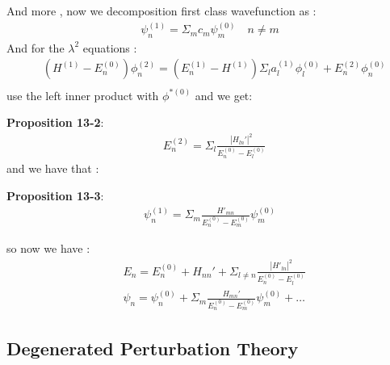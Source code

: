 \documentclass{article}
\begin{document}
And more , now we decomposition first class wavefunction as :
\begin{align}
  \psi_n^{(1)}=\Sigma_mc_m\psi^{(0)}_m\quad n\ne m
\end{align}
And for the $\lambda^2$ equations :
\begin{align}
  &(H^{(1)}-E^{(0)}_n)\phi^{(2)}_n=(E_n^{(1)}-H^{(1)})\Sigma_l a_l^{(1)}\phi_l^{(0)}+E_n^{(2)}\phi_n^{(0)} \\
\end{align}
use the left inner product with $\phi^{*(0)}$ and we get:

\textbf{Proposition 13-2}:
\begin{align}
  &E_n^{(2)}=\Sigma_l\frac{|H_{ln}'|^2}{E_n^{(0)}-E_l^{(0)}}
\end{align}
and we have that :

\textbf{Proposition 13-3}:
\begin{align}
  \psi_n^{(1)}=\Sigma_m\frac{H'_{mn}}{E^{(0)}_n-E^{(0)}_m}\psi_m^{(0)}
\end{align}

so now we have :
\begin{align}
  &E_n=E_n^{(0)}+H_{nn}'+\Sigma_{l\ne n}\frac{|H'_{ln}|^2}{E_n^{(0)}-E_l^{(0)}} \\
  &\psi_n=\psi^{(0)}_n+\Sigma_m\frac{H_{mn}'}{E_n^{(0)}-E_m^{(0)}}\psi^{(0)}_m+\dots 
\end{align}

\subsection{Degenerated Perturbation Theory }
\end{document}
